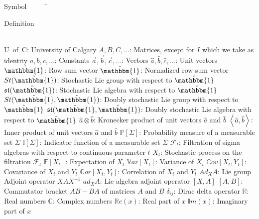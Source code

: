 \begin{tabbing}
	Symbol~~~~~\= \ \ \ \ \ \ \ \ \ \ \ \ \ \ \ \ \ \ \ \ \ \ \ \ \ \ \ \ \ \ \ \ \ \ \ \  \parbox{5in}{Definition}\\
	\addsymbol \mbox{U of C}: {University of Calgary}
	\addsymbol \mbox{$A,B,C,\dots$}: {Matrices, except for $I$ which we take as identity}
	\addsymbol \mbox{$a,b,c,\dots$}: {Constants}
	\addsymbol \mbox{$\vec{a},\vec{b},\vec{c},\dots$}: {Vectors}
	\addsymbol \mbox{$\hat{a},\hat{b},\hat{c},\dots$}: {Unit vectors}
	\addsymbol \mbox{$\vec{\mathbbm{1}}$}: {Row sum vector}
	\addsymbol \mbox{$\hat{\mathbbm{1}}$}: {Normalized row sum vector}
	\addsymbol \mbox{$St(\hat{\mathbbm{1}})$}: {Stochastic Lie group with respect to $\hat{\mathbbm{1}}$}
	\addsymbol \mbox{$\mathfrak{st}(\hat{\mathbbm{1}})$}: {Stochastic Lie algebra with respect to $\hat{\mathbbm{1}}$}
	\addsymbol \mbox{$St(\hat{\mathbbm{1}}, \hat{\mathbbm{1}})$}: {Doubly stochastic Lie group with respect to $\hat{\mathbbm{1}}$}
	\addsymbol \mbox{$\mathfrak{st}(\hat{\mathbbm{1}}, \hat{\mathbbm{1}})$}: {Doubly stochastic Lie algebra with respect to $\hat{\mathbbm{1}}$}
	\addsymbol \mbox{$\hat{a} \otimes \hat{b}$}: {Kronecker product of unit vectors $\hat{a}$ and $\hat{b}$}
	\addsymbol \mbox{$\left\langle \hat{a},\hat{b} \right\rangle$}: {Inner product of unit vectors $\hat{a}$ and $\hat{b}$}
	\addsymbol \mbox{$\mathbb{P}\left[\Sigma\right]$}: {Probability measure of a measurable set $\Sigma$}
	\addsymbol \mbox{$\mathbb{I}\left[\Sigma\right]$}: {Indicator function of a measurable set $\Sigma$}
	\addsymbol \mbox{$\mathscr{F}_t$}: {Filtration of sigma algebras with respect to continuous parameter $t$}
	\addsymbol \mbox{$X_t$}: {Stochastic process on the filtration $\mathscr{F}_t$}
	\addsymbol \mbox{$\mathbb{E}\left[X_t\right]$}: {Expectation of $X_t$}
	\addsymbol \mbox{$\mathbb{V}ar\left[X_t\right]$}: {Variance of $X_t$}
	\addsymbol \mbox{$\mathbb{C}ov\left[X_t, Y_t\right]$}: {Covariance of $X_t$ and $Y_t$}
	\addsymbol \mbox{$\mathbb{C}or\left[X_t, Y_t\right]$}: {Correlation of $X_t$ and $Y_t$}
	\addsymbol \mbox{$Ad_X A$}: {Lie group Adjoint operator $XAX^{-1}$}
	\addsymbol \mbox{$ad_X A$}: {Lie algebra adjoint operator $\left[X,A\right]$}
	\addsymbol \mbox{$\left[A,B\right]$}: {Commutator bracket $AB - BA$ of matrices $A$ and $B$}
	\addsymbol \mbox{$\delta_{ij}$}: {Dirac delta operator}
	\addsymbol \mbox{$\mathbb{R}$}: {Real numbers}
	\addsymbol \mbox{$\mathbb{C}$}: {Complex numbers}
	\addsymbol \mbox{$\mathbb{R}e\left(x\right)$}: {Real part of $x$}
	\addsymbol \mbox{$\mathbb{I}m\left(x\right)$}: {Imaginary part of $x$}
\end{tabbing}